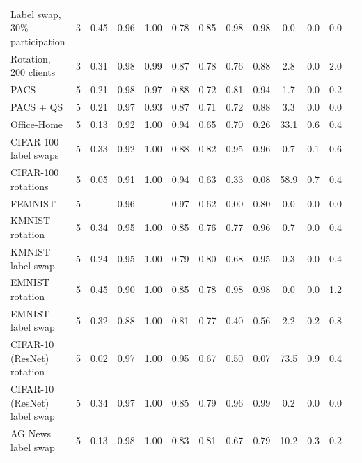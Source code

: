 {\begin{tabular}{l r c c c c c c c c c c c}
Label swap, 30\% participation & 3 & 0.45 & 0.96 & 1.00 & 0.78 & 0.85 & 0.98 & 0.98 & 0.0 & 0.0 & 0.0 \\
Rotation, 200 clients & 3 & 0.31 & 0.98 & 0.99 & 0.87 & 0.78 & 0.76 & 0.88 & 2.8 & 0.0 & 2.0 \\
PACS & 5 & 0.21 & 0.98 & 0.97 & 0.88 & 0.72 & 0.81 & 0.94 & 1.7 & 0.0 & 0.2 \\
PACS + QS & 5 & 0.21 & 0.97 & 0.93 & 0.87 & 0.71 & 0.72 & 0.88 & 3.3 & 0.0 & 0.0 \\
Office-Home & 5 & 0.13 & 0.92 & 1.00 & 0.94 & 0.65 & 0.70 & 0.26 & 33.1 & 0.6 & 0.4 \\
CIFAR-100 label swaps & 5 & 0.33 & 0.92 & 1.00 & 0.88 & 0.82 & 0.95 & 0.96 & 0.7 & 0.1 & 0.6 \\
CIFAR-100 rotations & 5 & 0.05 & 0.91 & 1.00 & 0.94 & 0.63 & 0.33 & 0.08 & 58.9 & 0.7 & 0.4 \\
FEMNIST & 5 & -- & 0.96 & -- & 0.97 & 0.62 & 0.00 & 0.80 & 0.0 & 0.0 & 0.0 \\
KMNIST rotation & 5 & 0.34 & 0.95 & 1.00 & 0.85 & 0.76 & 0.77 & 0.96 & 0.7 & 0.0 & 0.4 \\
KMNIST label swap & 5 & 0.24 & 0.95 & 1.00 & 0.79 & 0.80 & 0.68 & 0.95 & 0.3 & 0.0 & 0.4 \\
EMNIST rotation & 5 & 0.45 & 0.90 & 1.00 & 0.85 & 0.78 & 0.98 & 0.98 & 0.0 & 0.0 & 1.2 \\
EMNIST label swap & 5 & 0.32 & 0.88 & 1.00 & 0.81 & 0.77 & 0.40 & 0.56 & 2.2 & 0.2 & 0.8 \\
CIFAR-10 (ResNet) rotation & 5 & 0.02 & 0.97 & 1.00 & 0.95 & 0.67 & 0.50 & 0.07 & 73.5 & 0.9 & 0.4 \\
CIFAR-10 (ResNet) label swap & 5 & 0.34 & 0.97 & 1.00 & 0.85 & 0.79 & 0.96 & 0.99 & 0.2 & 0.0 & 0.0 \\
AG News label swap & 5 & 0.13 & 0.98 & 1.00 & 0.83 & 0.81 & 0.67 & 0.79 & 10.2 & 0.3 & 0.2 \\
\bottomrule
\end{tabular}
}
